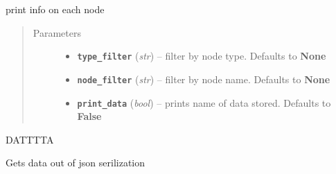 \documentclass[letterpaper,10pt,english]{sphinxmanual}
\begin{document}
\begin{fulllineitems}
\begin{fulllineitems}
\end{fulllineitems}


\begin{fulllineitems}
\label{zBuilder:zBuilder.nodeCollection.NodeCollection.compare}
print info on each node
\begin{quote}\begin{description}
\item[{Parameters}] \leavevmode\begin{itemize}
\item {} 
\textbf{\texttt{type\_filter}} (\emph{str}) -- filter by node type.  Defaults to \textbf{None}

\item {} 
\textbf{\texttt{node\_filter}} (\emph{str}) -- filter by node name. Defaults to \textbf{None}

\item {} 
\textbf{\texttt{print\_data}} (\emph{bool}) -- prints name of data stored.  Defaults to \textbf{False}

\end{itemize}

\end{description}\end{quote}

\end{fulllineitems}


\begin{fulllineitems}
\label{zBuilder:zBuilder.nodeCollection.NodeCollection.data}
DATTTTA

\end{fulllineitems}


\begin{fulllineitems}
\label{zBuilder:zBuilder.nodeCollection.NodeCollection.from_json_data}
Gets data out of json serilization

\end{fulllineitems}



\end{fulllineitems}
\end{document}
